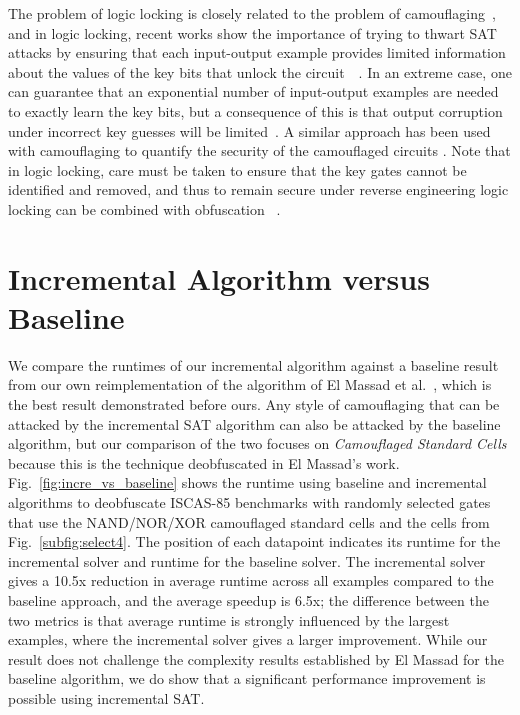 \documentclass[proposal]{umassthesis}  %
\begin{document}
The problem of logic locking is closely related to the problem of camouflaging~\cite{yasin-transforming}, and in logic locking, recent works show the importance of trying to thwart SAT attacks by ensuring that each input-output example provides limited information about the values of the key bits that unlock the circuit~\cite{yasin2016sarlock}~\cite{xie2016mitigatingsat}. In an extreme case, one can guarantee that an exponential number of input-output examples are needed to exactly learn the key bits, but a consequence of this is that output corruption under incorrect key guesses will be limited~\cite{yasin2016sarlock}. A similar approach has been used with camouflaging to quantify the security of the camouflaged circuits \cite{Yasin-iccad-16} \cite{MengLi-iccad-16}.  Note that in logic locking, care must be taken to ensure that the key gates cannot be identified and removed, and thus to remain secure under reverse engineering logic locking can be combined with obfuscation~\cite{yasin2016sarlock} \cite{shahzad-date17}. 
















\section{Incremental Algorithm versus Baseline}

We compare the runtimes of our incremental algorithm against a baseline result from our own reimplementation of the algorithm of El Massad et al.~\cite{elmassad-15}, which is the best result demonstrated before ours. {Any style of camouflaging that can be attacked by the incremental SAT algorithm can also be attacked by the baseline algorithm, but our comparison of the two focuses } on \textit{Camouflaged Standard Cells} because this is the technique deobfuscated in El Massad's work.
 Fig.~\ref{fig:incre_vs_baseline} shows the runtime using baseline and incremental algorithms to deobfuscate ISCAS-85 benchmarks with randomly selected gates that use the NAND/NOR/XOR camouflaged standard cells and the cells from Fig.~\ref{subfig:select4}. The position of each datapoint indicates its runtime for the incremental solver and runtime for the baseline solver. {The incremental solver gives a 10.5x reduction in average runtime across all examples compared to the baseline approach, and the average speedup is 6.5x; the difference between the two metrics is that average runtime is strongly influenced by the largest examples, where the incremental solver gives a larger improvement. While our result does not challenge the complexity results established by El Massad for the baseline algorithm, we do show that a significant performance improvement is possible using incremental SAT.}
\end{document}
